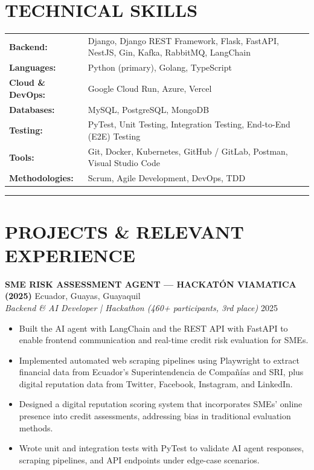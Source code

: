 \documentclass[11pt, a4paper]{article}
\begin{document}
\section*{TECHNICAL SKILLS}
\vspace{-2pt}
\begin{tabular}{p{} p{}}
\textbf{Backend:} & Django, Django REST Framework, Flask, FastAPI, NestJS, Gin, Kafka, RabbitMQ, LangChain \\
\textbf{Languages:} & Python (primary), Golang, TypeScript \\
\textbf{Cloud \& DevOps:} & Google Cloud Run, Azure, Vercel \\
\textbf{Databases:} & MySQL, PostgreSQL, MongoDB \\
\textbf{Testing:} & PyTest, Unit Testing, Integration Testing, End-to-End (E2E) Testing \\
\textbf{Tools:} & Git, Docker, Kubernetes, GitHub / GitLab, Postman, Visual Studio Code \\
\textbf{Methodologies:} & Scrum, Agile Development, DevOps, TDD \\
\end{tabular}
\vspace{6pt}
\hrule
\vspace{8pt}

\section*{PROJECTS \& RELEVANT EXPERIENCE}

\textbf{SME RISK ASSESSMENT AGENT --- HACKATÓN VIAMATICA (2025)} \hfill Ecuador, Guayas, Guayaquil \\
\textit{Backend \& AI Developer | Hackathon (460+ participants, 3rd place)} \hfill 2025

\begin{itemize}
\item Built the AI agent with LangChain and the REST API with FastAPI to enable frontend communication and real-time credit risk evaluation for SMEs.
\item Implemented automated web scraping pipelines using Playwright to extract financial data from Ecuador's Superintendencia de Compañías and SRI, plus digital reputation data from Twitter, Facebook, Instagram, and LinkedIn.
\item Designed a digital reputation scoring system that incorporates SMEs' online presence into credit assessments, addressing bias in traditional evaluation methods.
\item Wrote unit and integration tests with PyTest to validate AI agent responses, scraping pipelines, and API endpoints under edge-case scenarios.
\end{itemize}
\end{document}
